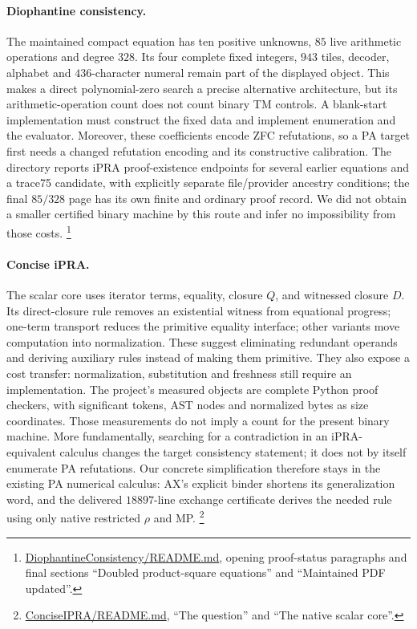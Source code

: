 \paragraph{Diophantine consistency.}
The maintained compact equation has ten positive unknowns, $85$ live
arithmetic operations and degree $328$. Its four complete fixed integers,
$943$ tiles, decoder, alphabet and $436$-character numeral remain part of
the displayed object. This makes a direct polynomial-zero search a precise
alternative architecture, but its arithmetic-operation count does not
count binary TM controls. A blank-start implementation must construct the
fixed data and implement enumeration and the evaluator. Moreover, these
coefficients encode ZFC refutations, so a PA target first needs a changed
refutation encoding and its constructive calibration. The directory
reports iPRA proof-existence endpoints for several earlier equations and
a trace75 candidate, with explicitly separate file/provider ancestry
conditions; the final $85/328$ page has its own finite and ordinary proof
record. We did not obtain a smaller certified binary machine by this route
and infer no impossibility from those costs.
\footnote{\href{https://github.com/VladimirReshetnikov/ProveIt/blob/32d0d8b7d93a63ad4106c18cdb29b37927acdad2/Computability/DiophantineConsistency/README.md}{DiophantineConsistency/README.md}, opening proof-status paragraphs and final sections ``Doubled product-square equations'' and ``Maintained PDF updated''.}

\paragraph{Concise iPRA.}
The scalar core uses iterator terms, equality, closure $Q$, and witnessed
closure $D$. Its direct-closure rule removes an existential witness from
equational progress; one-term transport reduces the primitive equality
interface; other variants move computation into normalization. These
suggest eliminating redundant operands and deriving auxiliary rules
instead of making them primitive. They also expose a cost transfer:
normalization, substitution and freshness still require an implementation.
The project's measured objects are complete Python proof checkers, with
significant tokens, AST nodes and normalized bytes as size coordinates.
Those measurements do not imply a count for the present binary machine.
More fundamentally, searching for a contradiction in an iPRA-equivalent
calculus changes the target consistency statement; it does not by itself
enumerate PA refutations. Our concrete simplification therefore stays in
the existing PA numerical calculus: AX's explicit binder shortens its
generalization word, and the delivered $18897$-line exchange certificate
derives the needed rule using only native restricted $\rho$ and MP.
\footnote{\href{https://github.com/VladimirReshetnikov/ProveIt/blob/32d0d8b7d93a63ad4106c18cdb29b37927acdad2/Logic/PrimitiveRecursiveArithmetic/ConciseIPRA/README.md}{ConciseIPRA/README.md}, ``The question'' and ``The native scalar core''.}
